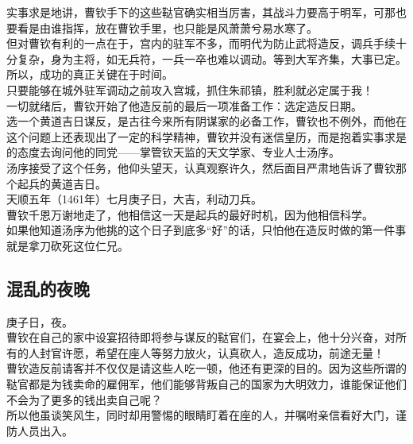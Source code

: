 \begin{multicols}{\theparacolNo}
实事求是地讲，曹钦手下的这些鞑官确实相当厉害，其战斗力要高于明军，可那也要看是由谁指挥，放在曹钦手里，也只能是风萧萧兮易水寒了。\\

但对曹钦有利的一点在于，宫内的驻军不多，而明代为防止武将造反，调兵手续十分复杂，身为主将，如无兵符，一兵一卒也难以调动。等到大军齐集，大事已定。所以，成功的真正关键在于时间。\\

只要能够在城外驻军调动之前攻入宫城，抓住朱祁镇，胜利就必定属于我！\\

一切就绪后，曹钦开始了他造反前的最后一项准备工作：选定造反日期。\\

选一个黄道吉日谋反，是古往今来所有阴谋家的必备工作，曹钦也不例外，而他在这个问题上还表现出了一定的科学精神，曹钦并没有迷信皇历，而是抱着实事求是的态度去询问他的同党——掌管钦天监的天文学家、专业人士汤序。\\

汤序接受了这个任务，他仰头望天，认真观察许久，然后面目严肃地告诉了曹钦那个起兵的黄道吉日。\\

天顺五年（1461年）七月庚子日，大吉，利动刀兵。\\

曹钦千恩万谢地走了，他相信这一天是起兵的最好时机，因为他相信科学。\\

如果他知道汤序为他挑的这个日子到底多“好”的话，只怕他在造反时做的第一件事就是拿刀砍死这位仁兄。\\

\subsection{混乱的夜晚}
庚子日，夜。\\

曹钦在自己的家中设宴招待即将参与谋反的鞑官们，在宴会上，他十分兴奋，对所有的人封官许愿，希望在座人等努力放火，认真砍人，造反成功，前途无量！\\

曹钦造反前请客并不仅仅是请这些人吃一顿，他还有更深的目的。因为这些所谓的鞑官都是为钱卖命的雇佣军，他们能够背叛自己的国家为大明效力，谁能保证他们不会为了更多的钱出卖自己呢？\\

所以他虽谈笑风生，同时却用警惕的眼睛盯着在座的人，并嘱咐亲信看好大门，谨防人员出入。\\


\end{multicols}

